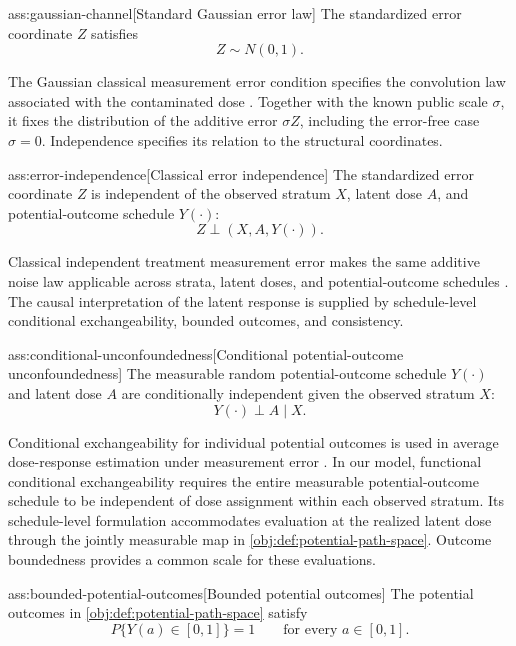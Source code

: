 \documentclass[11pt]{article}
\begin{document}
\begin{assumptionv}{ass:gaussian-channel}[Standard Gaussian error law]
The standardized error coordinate \(Z\) satisfies
\[
Z\sim N(0,1).
\]
\end{assumptionv}

The Gaussian classical measurement error condition specifies the convolution law associated with the contaminated dose \citep{FanTruong1993}. Together with the known public scale \(\sigma\), it fixes the distribution of the additive error \(\sigma Z\), including the error-free case \(\sigma=0\). Independence specifies its relation to the structural coordinates.

\begin{assumptionv}{ass:error-independence}[Classical error independence]
The standardized error coordinate \(Z\) is independent of the observed stratum \(X\), latent dose \(A\), and potential-outcome schedule \(Y(\cdot)\):
\[
Z\perp(X,A,Y(\cdot)).
\]
\end{assumptionv}

Classical independent treatment measurement error makes the same additive noise law applicable across strata, latent doses, and potential-outcome schedules \citep{HuangZhang2023}. The causal interpretation of the latent response is supplied by schedule-level conditional exchangeability, bounded outcomes, and consistency.

\begin{assumptionv}{ass:conditional-unconfoundedness}[Conditional potential-outcome unconfoundedness]
The measurable random potential-outcome schedule \(Y(\cdot)\) and latent dose \(A\) are conditionally independent given the observed stratum \(X\):
\[
Y(\cdot)\perp A\mid X.
\]
\end{assumptionv}

Conditional exchangeability for individual potential outcomes is used in average dose-response estimation under measurement error \citep{HuangZhang2023}. In our model, functional conditional exchangeability requires the entire measurable potential-outcome schedule to be independent of dose assignment within each observed stratum. Its schedule-level formulation accommodates evaluation at the realized latent dose through the jointly measurable map in \cref{obj:def:potential-path-space}. Outcome boundedness provides a common scale for these evaluations.

\begin{assumptionv}{ass:bounded-potential-outcomes}[Bounded potential outcomes]
The potential outcomes in \cref{obj:def:potential-path-space} satisfy
\[
P\{Y(a)\in[0,1]\}=1
\qquad
\text{for every }a\in[0,1].
\]
\end{assumptionv}
\end{document}

